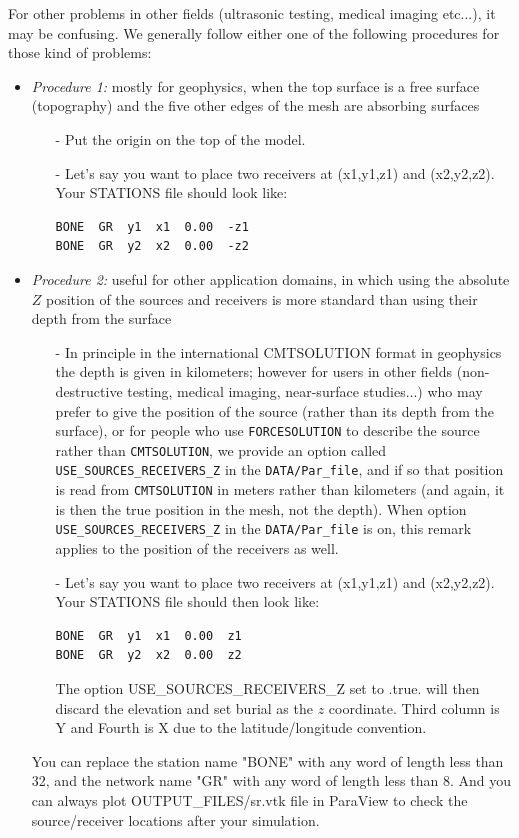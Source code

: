 \noindent
For other problems in other
fields (ultrasonic testing, medical imaging etc...),
it may be confusing. We generally follow either one of the following
procedures for those kind of problems:
\begin{itemize}
\item {\it Procedure 1:} mostly for geophysics, when the top surface is a free surface (topography) and the five other edges of the mesh are absorbing surfaces
\begin{enumerate}
\item [-] Put the origin on the top of the model.\newline
\item [-] Let's say you want to place two receivers at (x1,y1,z1) and
(x2,y2,z2). Your STATIONS file should look like:
{\small \begin{verbatim}
BONE  GR  y1  x1  0.00  -z1
BONE  GR  y2  x2  0.00  -z2
\end{verbatim}}
\end{enumerate}

\item {\it Procedure 2:} useful for other application domains, in which using the absolute $Z$ position of the sources and receivers is more standard than using their depth from the surface
\begin{enumerate}
\item [-] In principle in the international CMTSOLUTION format in geophysics
the depth is given in kilometers; however for users in other fields (non-destructive testing, medical imaging, near-surface studies...) who may prefer to give the position of the source (rather than its depth from the surface), or for people who use \texttt{FORCESOLUTION} to describe the source rather than \texttt{CMTSOLUTION}, we provide an option called \texttt{USE\_SOURCES\_RECEIVERS\_Z} in the \texttt{DATA/Par\_file}, and if so that position is read from \texttt{CMTSOLUTION} in meters rather than kilometers (and again, it is then the true position in the mesh, not the depth). When option \texttt{USE\_SOURCES\_RECEIVERS\_Z} in the \texttt{DATA/Par\_file} is on, this remark applies to the position of the receivers as well.\newline
\item [-] Let's say you want to place two receivers at (x1,y1,z1) and
(x2,y2,z2). Your STATIONS file should then look like:
{\small \begin{verbatim}
BONE  GR  y1  x1  0.00  z1
BONE  GR  y2  x2  0.00  z2
\end{verbatim}}
The option USE\_SOURCES\_RECEIVERS\_Z set to .true. will then discard the elevation and set
burial as the $z$ coordinate.
Third column is Y and Fourth is X due to the latitude/longitude convention.\newline
\end{enumerate}

You can replace the station name "BONE" with any word of length less
than 32, and the network name "GR" with any word of length less than
8.
And you can always plot OUTPUT\_FILES/sr.vtk file in ParaView to check the
source/receiver locations after your simulation.\newline
\end{itemize}


